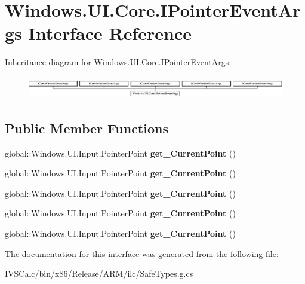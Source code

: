 \hypertarget{interface_windows_1_1_u_i_1_1_core_1_1_i_pointer_event_args}{}\section{Windows.\+U\+I.\+Core.\+I\+Pointer\+Event\+Args Interface Reference}
\label{interface_windows_1_1_u_i_1_1_core_1_1_i_pointer_event_args}
Inheritance diagram for Windows.\+U\+I.\+Core.\+I\+Pointer\+Event\+Args\+:\begin{figure}[H]
\begin{center}
\leavevmode
\includegraphics[height=1.004484cm]{interface_windows_1_1_u_i_1_1_core_1_1_i_pointer_event_args}
\end{center}
\end{figure}
\subsection*{Public Member Functions}
\begin{DoxyCompactItemize}
\item 
\mbox{\label{interface_windows_1_1_u_i_1_1_core_1_1_i_pointer_event_args_ab45dcb7e043ae3a4ef39aea91b323b36}} 
global\+::\+Windows.\+U\+I.\+Input.\+Pointer\+Point {\bfseries get\+\_\+\+Current\+Point} ()
\item 
\mbox{\label{interface_windows_1_1_u_i_1_1_core_1_1_i_pointer_event_args_ab45dcb7e043ae3a4ef39aea91b323b36}} 
global\+::\+Windows.\+U\+I.\+Input.\+Pointer\+Point {\bfseries get\+\_\+\+Current\+Point} ()
\item 
\mbox{\label{interface_windows_1_1_u_i_1_1_core_1_1_i_pointer_event_args_ab45dcb7e043ae3a4ef39aea91b323b36}} 
global\+::\+Windows.\+U\+I.\+Input.\+Pointer\+Point {\bfseries get\+\_\+\+Current\+Point} ()
\item 
\mbox{\label{interface_windows_1_1_u_i_1_1_core_1_1_i_pointer_event_args_ab45dcb7e043ae3a4ef39aea91b323b36}} 
global\+::\+Windows.\+U\+I.\+Input.\+Pointer\+Point {\bfseries get\+\_\+\+Current\+Point} ()
\item 
\mbox{\label{interface_windows_1_1_u_i_1_1_core_1_1_i_pointer_event_args_ab45dcb7e043ae3a4ef39aea91b323b36}} 
global\+::\+Windows.\+U\+I.\+Input.\+Pointer\+Point {\bfseries get\+\_\+\+Current\+Point} ()
\end{DoxyCompactItemize}


The documentation for this interface was generated from the following file\+:\begin{DoxyCompactItemize}
\item 
I\+V\+S\+Calc/bin/x86/\+Release/\+A\+R\+M/ilc/Safe\+Types.\+g.\+cs\end{DoxyCompactItemize}
